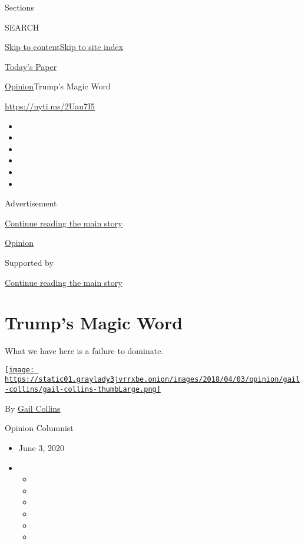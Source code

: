 Sections

SEARCH

\protect\hyperlink{site-content}{Skip to
content}\protect\hyperlink{site-index}{Skip to site index}

\href{https://myaccount.nytimes3xbfgragh.onion/auth/login?response_type=cookie\&client_id=vi}{}

\href{https://www.nytimes3xbfgragh.onion/section/todayspaper}{Today's
Paper}

\href{/section/opinion}{Opinion}\textbar{}Trump's Magic Word

\url{https://nyti.ms/2Uau7I5}

\begin{itemize}
\item
\item
\item
\item
\item
\item
\end{itemize}

Advertisement

\protect\hyperlink{after-top}{Continue reading the main story}

\href{/section/opinion}{Opinion}

Supported by

\protect\hyperlink{after-sponsor}{Continue reading the main story}

\hypertarget{trumps-magic-word}{%
\section{Trump's Magic Word}\label{trumps-magic-word}}

What we have here is a failure to dominate.

\href{https://www.nytimes3xbfgragh.onion/by/gail-collins}{\texttt{[image: https://static01.graylady3jvrrxbe.onion/images/2018/04/03/opinion/gail-collins/gail-collins-thumbLarge.png]}}

By \href{https://www.nytimes3xbfgragh.onion/by/gail-collins}{Gail
Collins}

Opinion Columnist

\begin{itemize}
\item
  June 3, 2020
\item
  \begin{itemize}
  \item
  \item
  \item
  \item
  \item
  \item
  \end{itemize}
\end{itemize}

